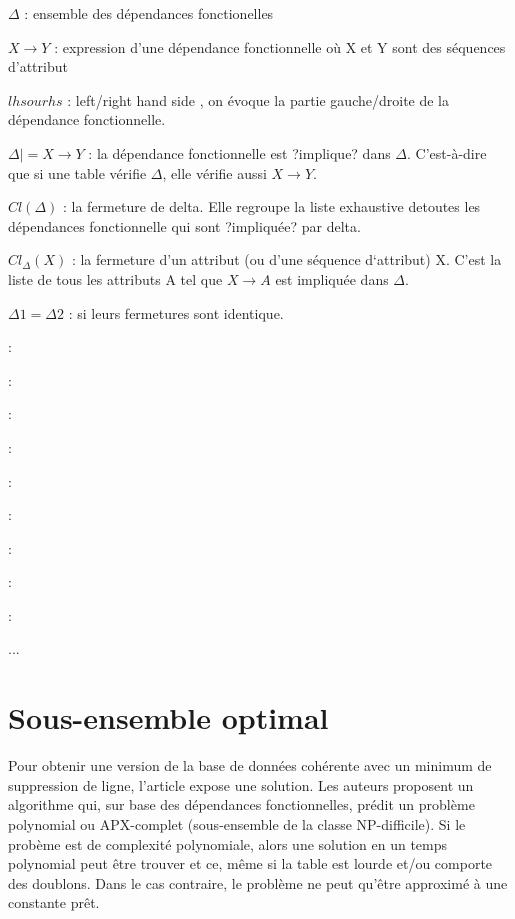 \documentclass[12pt, a4paper, oneside, titlepage]{book}%
\begin{document}
\begin{description}
\item{$\Delta$ : } ensemble des dépendances fonctionelles
\item{$X \rightarrow Y$ : } expression d'une dépendance fonctionnelle où X et Y sont des séquences d'attribut
\item{$lhs ou rhs$ : } \fg left/right hand side \og, on évoque la partie gauche/droite de la dépendance fonctionnelle.
\item{$\Delta |= X \rightarrow Y$ : } la dépendance fonctionnelle est ?implique? dans $\Delta$. C'est-à-dire que si une table vérifie $\Delta$, elle vérifie aussi $X \rightarrow Y$.
\item{$Cl(\Delta)$ : } la fermeture de delta. Elle regroupe la liste exhaustive detoutes les dépendances fonctionnelle qui sont ?impliquée? par delta.
\item{$Cl_\Delta(X)$ : }  la fermeture d’un attribut (ou d’une séquence d‘attribut) X. C’est la liste de tous les attributs A tel que $X \rightarrow A$ est impliquée dans $\Delta$.
\item{$\Delta1 = \Delta2$ : } si leurs fermetures sont identique.



\item{ : } 
\item{ : } 
\item{ : } 
\item{ : } 
\item{ : } 
\item{ : } 
\item{ : } 
\item{ : } 
\item{ : } 
\end{description}
...
\clearpage
\chapter{Sous-ensemble optimal}\label{CHsrepair}
Pour obtenir une version de la base de données cohérente avec un minimum de suppression de ligne, l'article \cite{article} expose une solution. Les auteurs proposent un algorithme qui, sur base des dépendances fonctionnelles, prédit un problème polynomial ou APX-complet (sous-ensemble de la classe NP-difficile). Si le probème est de complexité polynomiale, alors une solution en un temps polynomial peut être trouver et ce, même si la table est lourde et/ou comporte des doublons. Dans le cas contraire, le problème ne peut qu'être approximé à une constante prêt.
\end{document}
